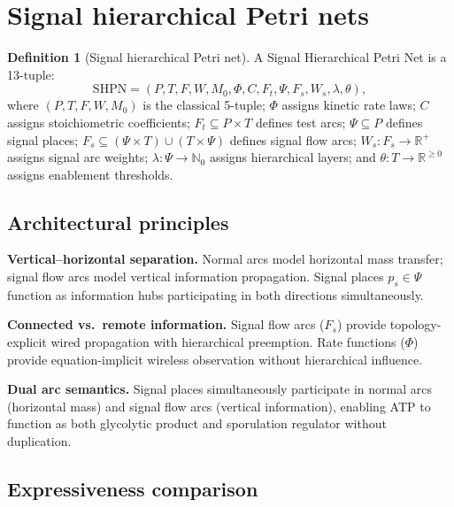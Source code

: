 \documentclass[11pt,a4paper]{article}
\theoremstyle{plain}
\theoremstyle{definition}
\newtheorem{definition}{Definition}
\begin{document}
\section{Signal hierarchical Petri nets}

\begin{definition}[Signal hierarchical Petri net]
A Signal Hierarchical Petri Net is a 13-tuple:
\begin{equation}
\mathrm{SHPN} = (P, T, F, W, M_0, \Phi, C, F_t, \Psi, F_s, W_s, \lambda, \theta),
\end{equation}
where $(P, T, F, W, M_0)$ is the classical 5-tuple; $\Phi$ assigns kinetic rate laws; $C$ assigns stoichiometric coefficients; $F_t \subseteq P \times T$ defines test arcs; $\Psi \subseteq P$ defines signal places; $F_s \subseteq (\Psi \times T) \cup (T \times \Psi)$ defines signal flow arcs; $W_s: F_s \rightarrow \mathbb{R}^+$ assigns signal arc weights; $\lambda: \Psi \rightarrow \mathbb{N}_0$ assigns hierarchical layers; and $\theta: T \rightarrow \mathbb{R}^{\geq 0}$ assigns enablement thresholds.
\end{definition}

\subsection{Architectural principles}

\textbf{Vertical--horizontal separation.} Normal arcs model horizontal mass transfer; signal flow arcs model vertical information propagation. Signal places $p_s \in \Psi$ function as information hubs participating in both directions simultaneously.

\textbf{Connected vs.\ remote information.} Signal flow arcs ($F_s$) provide topology-explicit wired propagation with hierarchical preemption. Rate functions ($\Phi$) provide equation-implicit wireless observation without hierarchical influence.

\textbf{Dual arc semantics.} Signal places simultaneously participate in normal arcs (horizontal mass) and signal flow arcs (vertical information), enabling ATP to function as both glycolytic product and sporulation regulator without duplication.

\subsection{Expressiveness comparison}
\end{document}
